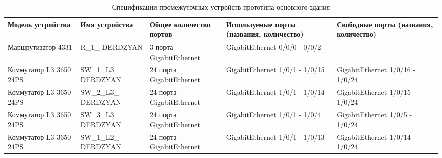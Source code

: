\begin{table}[H]
    \centering
	\caption{Спецификации промежуточных устройств прототипа основного здания\label{table:specif_uzlov_oz}}
    \small
	\begin{tabularx}{\textwidth}{|X|X|X|X|X|}
        \hline
		Модель устройства&Имя устройства& Общее количество портов&Используемые порты (названия, количество) & Свободные порты (названия, количество) \\
        \hline
		Маршрутизатор 4331	&	R\_1\_ DERDZYAN  & 3 порта GigabitEthernet & GigabitEthernet 0/0/0 - 0/0/2 & ---\\
		\hline
		Коммутатор L3 3650 24PS		&	SW\_1\_L3\_ DERDZYAN  & 24 порта GigabitEthernet & GigabitEthernet 1/0/1 - 1/0/15 & GigabitEthernet 1/0/16 - 1/0/24	\\
        \hline
		Коммутатор L3 3650 24PS		&	SW\_2\_L3\_ DERDZYAN  & 24 порта GigabitEthernet & GigabitEthernet 1/0/1 - 1/0/14 & GigabitEthernet 1/0/15 - 1/0/24	\\
        \hline
		Коммутатор L3 3650 24PS		&	SW\_3\_L3\_ DERDZYAN  & 24 порта GigabitEthernet & GigabitEthernet 1/0/1 - 1/0/4 & GigabitEthernet 1/0/5 - 1/0/24	\\
        \hline
		Коммутатор L3 3650 24PS		&	SW\_1\_L2\_ DERDZYAN	& 24 порта GigabitEthernet 						 & GigabitEthernet 1/0/1 - 1/0/13 & GigabitEthernet 1/0/14 - 1/0/24 \\
    \end{tabularx}
\end{table}

